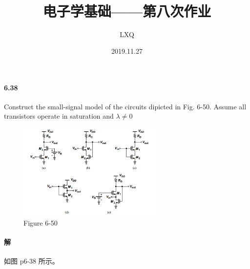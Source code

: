\documentclass[hyperref, UTF8]{ctexart}
\title{电子学基础——第八次作业}
\author{LXQ}
\date{2019.11.27}
\begin{document}
\maketitle

\paragraph{6.38} \label{6.38}
    Construct the small-signal model of the circuits dipicted in Fig. 6-50. Assume all transistors operate in saturation and $\lambda \neq 0$

    \begin{figure}[!htb]
        \centering
        \includegraphics[width=0.651\textwidth]{p6-50.png}
        \caption*{Figure 6-50}
    \end{figure}    

\paragraph{解} 如图 p6-38 所示。

\newpage
\end{document}
